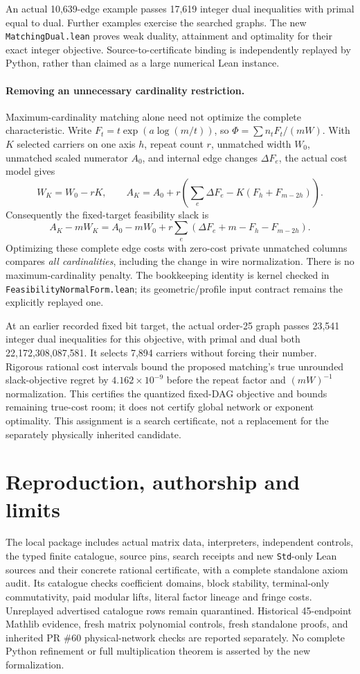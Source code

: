 \documentclass[11pt]{article}
\begin{document}
An actual 10,639-edge example passes 17,619 integer dual inequalities with
primal equal to dual. Further examples exercise the searched graphs.
The new \texttt{MatchingDual.lean} proves weak duality, attainment and
optimality for their exact integer objective. Source-to-certificate binding
is independently replayed by Python, rather than claimed as a large
numerical Lean instance.

\paragraph{Removing an unnecessary cardinality restriction.}
Maximum-cardinality matching alone need not optimize the complete
characteristic. Write $F_t=t\exp(a\log(m/t))$, so
$\Phi=\sum n_tF_t/(mW)$. With $K$ selected carriers on one axis $h$,
repeat count $r$, unmatched width $W_0$, unmatched scaled numerator $A_0$,
and internal edge changes $\Delta F_e$, the actual cost model gives
\[
 W_K=W_0-rK,\qquad
 A_K=A_0+r\left(\sum_e\Delta F_e-K(F_h+F_{m-2h})\right).
\]
Consequently the fixed-target feasibility slack is
\begin{equation}\label{eq:allcard}
 A_K-mW_K=A_0-mW_0+
 r\sum_e\left(\Delta F_e+m-F_h-F_{m-2h}\right).
\end{equation}
Optimizing these complete edge costs with zero-cost private unmatched
columns compares \emph{all cardinalities}, including the change in wire
normalization. There is no maximum-cardinality penalty. The bookkeeping
identity is kernel checked in \texttt{FeasibilityNormalForm.lean}; its
geometric/profile input contract remains the explicitly replayed one.

At an earlier recorded fixed bit target, the actual order-25 graph passes 23,541
integer dual inequalities for this objective, with primal and dual both
22,172,308,087,581. It selects 7,894 carriers without forcing their number.
Rigorous rational cost intervals bound the proposed matching's true
unrounded slack-objective regret by $4.162\times10^{-9}$ before the repeat
factor and $(mW)^{-1}$ normalization. This certifies the quantized fixed-DAG
objective and bounds remaining true-cost room; it does not certify global
network or exponent optimality. This assignment is a search certificate,
not a replacement for the separately physically inherited candidate.

\section{Reproduction, authorship and limits}
The local package includes actual matrix data, interpreters, independent
controls, the typed finite catalogue, source pins, search receipts and new
\texttt{Std}-only Lean sources and their concrete rational certificate,
with a complete standalone axiom audit. Its catalogue checks coefficient domains,
block stability, terminal-only commutativity, paid modular lifts, literal
factor lineage and fringe costs. Unreplayed advertised catalogue rows remain
quarantined. Historical 45-endpoint Mathlib evidence, fresh matrix polynomial
controls, fresh standalone proofs, and inherited PR \#60 physical-network checks are
reported separately. No complete Python refinement or full multiplication
theorem is asserted by the new formalization.
\end{document}
